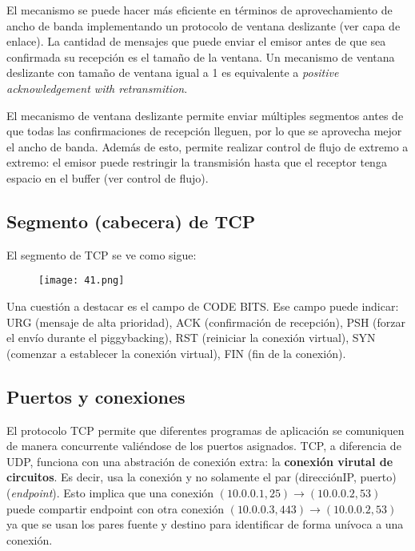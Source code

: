 \documentclass{book}
\begin{document}
	El mecanismo se puede hacer más eficiente en términos de aprovechamiento de ancho de banda implementando un protocolo de ventana deslizante (ver capa de enlace). La cantidad de mensajes que puede enviar el emisor antes de que sea confirmada su recepción es el tamaño de la ventana. Un mecanismo de ventana deslizante con tamaño de ventana igual a 1 es equivalente a \textit{positive acknowledgement with retransmition}.
	
	\vspace{3mm}
	El mecanismo de ventana deslizante permite enviar múltiples segmentos antes de que todas las confirmaciones de recepción lleguen, por lo que se aprovecha mejor el ancho de banda. Además de esto, permite realizar control de flujo de extremo a extremo: el emisor puede restringir la transmisión hasta que el receptor tenga espacio en el buffer (ver control de flujo).
	
	\pagebreak
	\subsection{Segmento (cabecera) de TCP}
	El segmento de TCP se ve como sigue:
	
	\begin{figure}[H]
		\centering
		\texttt{[image: 41.png]}
	\end{figure}
	
	Una cuestión a destacar es el campo de CODE BITS. Ese campo puede indicar: URG (mensaje de alta prioridad), ACK (confirmación de recepción), PSH (forzar el envío durante el piggybacking), RST (reiniciar la conexión virtual), SYN (comenzar a establecer la conexión virtual), FIN (fin de la conexión).
	
	\subsection{Puertos y conexiones}
	El protocolo TCP permite que diferentes programas de aplicación se comuniquen de manera concurrente valiéndose de los puertos asignados. TCP, a diferencia de UDP, funciona con una abstración de conexión extra: la \textbf{conexión virutal de circuitos}. Es decir, usa la conexión y no solamente el par (direcciónIP, puerto) (\textit{endpoint}). Esto implica que una conexión $(10.0.0.1, 25) \rightarrow (10.0.0.2, 53)$ puede compartir endpoint con otra conexión $(10.0.0.3, 443) \rightarrow (10.0.0.2, 53)$ ya que se usan los pares fuente y destino para identificar de forma unívoca a una conexión.
	
\end{document}
